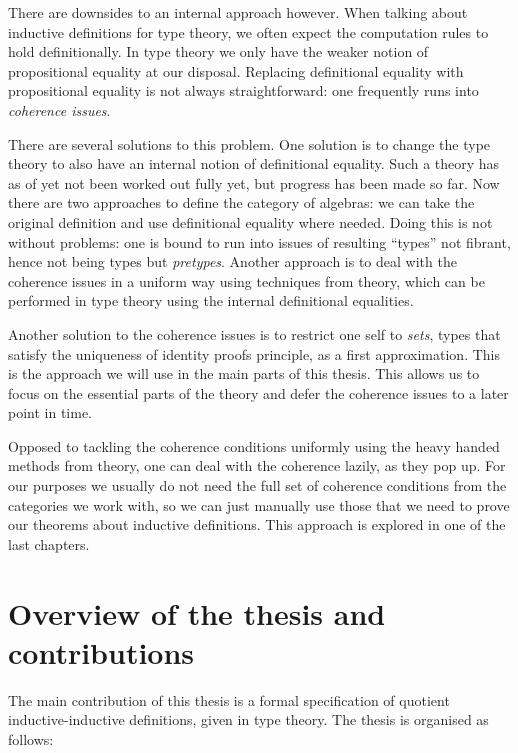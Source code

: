There are downsides to an internal approach however. When talking
about inductive definitions for type theory, we often expect the
computation rules to hold definitionally. In type theory we only have
the weaker notion of propositional equality at our disposal. Replacing
definitional equality with propositional equality is not always
straightforward: one frequently runs into \emph{coherence
  issues}.

There are several solutions to this problem. One solution is to change
the type theory to also have an internal notion of definitional
equality. Such a theory has as of yet not been worked out fully yet,
but progress has been made so far. Now there are two approaches to
define the category of algebras: we can take the original definition
and use definitional equality where needed. Doing this is not without
problems: one is bound to run into issues of resulting ``types'' not
fibrant, hence not being types but \emph{pretypes}. Another approach
is to deal with the coherence issues in a uniform way using techniques
from \inftycat theory, which can be performed in type theory using the
internal definitional equalities.

Another solution to the coherence issues is to restrict one self to
\emph{sets}, \ie types that satisfy the uniqueness of identity proofs
principle, as a first approximation. This is the approach we will use
in the main parts of this thesis. This allows us to focus on the
essential parts of the theory and defer the coherence issues to a
later point in time.

Opposed to tackling the coherence conditions uniformly using the heavy
handed methods from \inftycat theory, one can deal with the coherence
lazily, \ie as they pop up. For our purposes we usually do not need
the full set of coherence conditions from the categories we work with,
so we can just manually use those that we need to prove our theorems
about inductive definitions. This approach is explored in one of the
last chapters.

\section{Overview of the thesis and contributions}

The main contribution of this thesis is a formal specification of
quotient inductive-inductive definitions, given in type theory. The
thesis is organised as follows:

